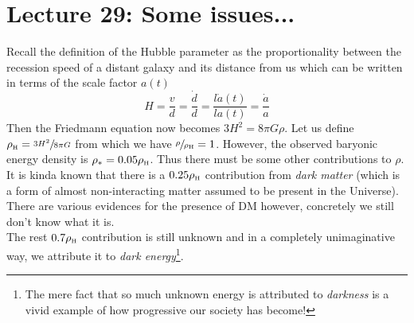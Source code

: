\section*{Lecture 29: Some issues...}
Recall the definition of the Hubble parameter as the proportionality between the recession speed of a distant galaxy and its distance from us which can be written in terms of the scale factor $a(t)$
$$H =\frac{v}{d} = \frac{\dot{d}}{d}= \frac{l\dot{a}(t)}{la(t)} = \frac{\dot{a}}{a}$$
Then the Friedmann equation now becomes $3H^2 = 8\pi G\rho$. Let us define $\rho_{\text{\tiny H}} = \sfrac{3H^2}{8\pi G}$ from which we have $\sfrac{\rho}{\rho_{\text{\tiny H}}}=1$. However, the observed baryonic energy density is $\rho_{*} = 0.05\rho_{\text{\tiny H}}$. Thus there must be some other contributions to $\rho$.\\[0.2cm] It is kinda known that there is a $0.25\rho_{\text{\tiny H}}$ contribution from \textit{dark matter} (which is a form of almost non-interacting matter assumed to be present in the Universe). There are various evidences for the presence of DM however, concretely we still don't know what it is.\\[0.2cm]The rest $0.7\rho_{\text{\tiny H}}$ contribution is still unknown and in a completely unimaginative way, we attribute it to \textit{dark energy}\footnote{The mere fact that so much unknown energy is attributed to \textit{darkness} is a vivid example of how progressive our society has become!}.\\[0.2cm]
